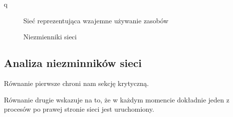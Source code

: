 q
\begin{figure}[h!]
	\caption{Sieć reprezentująca wzajemne używanie zasobów}
	\label{zad2:graph1}
\end{figure}
\begin{figure}[h!]
	\caption{Niezmienniki sieci}
	\label{zad2:graph1}
\end{figure}

\subsection{Analiza niezminników sieci}
Równanie pierwsze chroni nam sekcję krytyczną. 

Równanie drugie wskazuje na to, że w każdym momencie dokładnie jeden z procesów 
po prawej stronie sieci jest uruchomiony.

